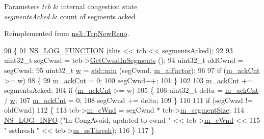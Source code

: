 \begin{DoxyParams}{Parameters}
{\em tcb} & internal congestion state \\
\hline
{\em segments\+Acked} & count of segments acked \\
\hline
\end{DoxyParams}


Reimplemented from \hyperlink{classns3_1_1TcpNewReno_a34a5eec0649a7b485852c74c825e14ba}{ns3\+::\+Tcp\+New\+Reno}.


\begin{DoxyCode}
90 \{
91   \hyperlink{log-macros-disabled_8h_a90b90d5bad1f39cb1b64923ea94c0761}{NS\_LOG\_FUNCTION} (\textcolor{keyword}{this} << tcb << segmentsAcked);
92 
93   uint32\_t segCwnd = tcb->\hyperlink{classns3_1_1TcpSocketState_ab6dfe309ca53fd3207dcafede75ad12d}{GetCwndInSegments} ();
94   uint32\_t oldCwnd = segCwnd;
95   uint32\_t \hyperlink{lte_2model_2fading-traces_2fading__trace__generator_8m_afd61ec66f9d7b807eece6eb12c781844}{w} = \hyperlink{80211b_8c_ac6afabdc09a49a433ee19d8a9486056d}{std::min} (segCwnd, \hyperlink{classns3_1_1TcpScalable_a850f65ce80a8d0293fe0a3d84b74e69c}{m\_aiFactor});
96 
97   \textcolor{keywordflow}{if} (\hyperlink{classns3_1_1TcpScalable_a61ab84bfbbec1ed78ca9c7b60d9aaa5a}{m\_ackCnt} >= w)
98     \{
99       \hyperlink{classns3_1_1TcpScalable_a61ab84bfbbec1ed78ca9c7b60d9aaa5a}{m\_ackCnt} = 0;
100       segCwnd++;
101     \}
102 
103   \hyperlink{classns3_1_1TcpScalable_a61ab84bfbbec1ed78ca9c7b60d9aaa5a}{m\_ackCnt} += segmentsAcked;
104   \textcolor{keywordflow}{if} (\hyperlink{classns3_1_1TcpScalable_a61ab84bfbbec1ed78ca9c7b60d9aaa5a}{m\_ackCnt} >= w)
105     \{
106       uint32\_t delta = \hyperlink{classns3_1_1TcpScalable_a61ab84bfbbec1ed78ca9c7b60d9aaa5a}{m\_ackCnt} / \hyperlink{lte_2model_2fading-traces_2fading__trace__generator_8m_afd61ec66f9d7b807eece6eb12c781844}{w};
107       \hyperlink{classns3_1_1TcpScalable_a61ab84bfbbec1ed78ca9c7b60d9aaa5a}{m\_ackCnt} = 0;
108       segCwnd += delta;
109     \}
110 
111   \textcolor{keywordflow}{if} (segCwnd != oldCwnd)
112     \{
113       tcb->\hyperlink{classns3_1_1TcpSocketState_a7cd3d2156a483c1db436097477a0fd7f}{m\_cWnd} = segCwnd * tcb->\hyperlink{classns3_1_1TcpSocketState_a079872f7b0099ef5f3cab4ff47bd2edd}{m\_segmentSize};
114       \hyperlink{group__logging_gafbd73ee2cf9f26b319f49086d8e860fb}{NS\_LOG\_INFO} (\textcolor{stringliteral}{"In CongAvoid, updated to cwnd "} << tcb->\hyperlink{classns3_1_1TcpSocketState_a7cd3d2156a483c1db436097477a0fd7f}{m\_cWnd} <<
115                    \textcolor{stringliteral}{" ssthresh "} << tcb->\hyperlink{classns3_1_1TcpSocketState_aec003b6dba9d269bfb1036c7652ffbd6}{m\_ssThresh});
116     \}
117 \}
\end{DoxyCode}


